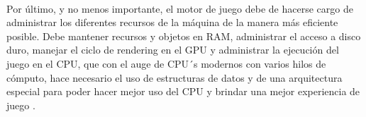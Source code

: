\documentclass{standalone}
\begin{document}
\paragraph{}
Por último, y no menos importante, el motor de juego debe de hacerse cargo de administrar los diferentes recursos de la máquina de la manera más eficiente posible. Debe mantener recursos y objetos en RAM, administrar el acceso a disco duro, manejar el ciclo de rendering en el GPU y administrar la ejecución del juego en el CPU, que con el auge de CPU´s modernos con varios hilos de cómputo, hace necesario el uso de estructuras de datos y de una arquitectura especial para poder hacer mejor uso del CPU y brindar una mejor experiencia de juego \cite{andrews2009designing}.
\end{document}

